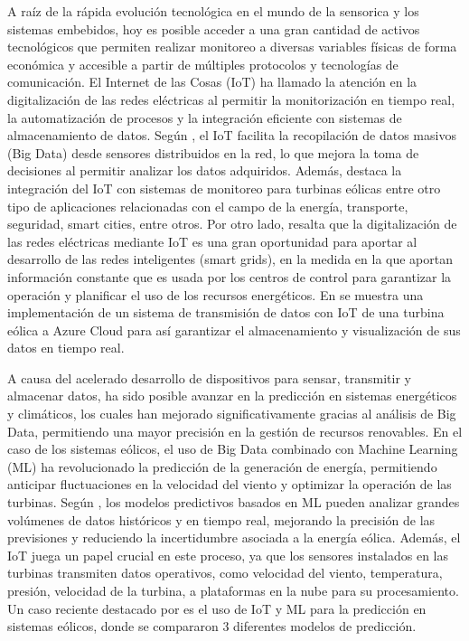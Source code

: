 \documentclass[letterpaper,12pt, oneside]{book}
\begin{document}
A raíz de la rápida evolución tecnológica en el mundo de la sensorica y los sistemas embebidos, hoy es posible acceder a una gran cantidad de activos tecnológicos que permiten realizar monitoreo a diversas variables físicas de forma económica y accesible a partir de múltiples protocolos y tecnologías de comunicación. El Internet de las Cosas (IoT) ha llamado la atención en la digitalización de las redes eléctricas al permitir la monitorización en tiempo real, la automatización de procesos y la integración eficiente con sistemas de almacenamiento de datos. Según \cite{ref19}, el IoT facilita la recopilación de datos masivos (Big Data) desde sensores distribuidos en la red, lo que mejora la toma de decisiones al permitir analizar los datos adquiridos. Además, \cite{ref20} destaca la integración del IoT con sistemas de monitoreo para turbinas eólicas entre otro tipo de aplicaciones relacionadas con el campo de la energía, transporte, seguridad, smart cities, entre otros. Por otro lado, \cite{ref21} resalta que la digitalización de las redes eléctricas mediante IoT es una gran oportunidad para aportar al desarrollo de las redes inteligentes (smart grids), en la medida en la que aportan información constante que es usada por los centros de control para garantizar la operación y planificar el uso de los recursos energéticos. En \cite{ref22} se muestra una implementación de un sistema de transmisión de datos con IoT de una turbina eólica a Azure Cloud para así garantizar el almacenamiento y visualización de sus datos en tiempo real. 


A causa del acelerado desarrollo de dispositivos para sensar, transmitir y almacenar datos, ha sido posible avanzar en la predicción en sistemas energéticos y climáticos, los cuales han mejorado significativamente gracias al análisis de Big Data, permitiendo una mayor precisión en la gestión de recursos renovables. En el caso de los sistemas eólicos, el uso de Big Data combinado con Machine Learning (ML) ha revolucionado la predicción de la generación de energía, permitiendo anticipar fluctuaciones en la velocidad del viento y optimizar la operación de las turbinas. Según \cite{ref23}, los modelos predictivos basados en ML pueden analizar grandes volúmenes de datos históricos y en tiempo real, mejorando la precisión de las previsiones y reduciendo la incertidumbre asociada a la energía eólica. Además, el IoT juega un papel crucial en este proceso, ya que los sensores instalados en las turbinas transmiten datos operativos, como velocidad del viento, temperatura, presión, velocidad de la turbina, a plataformas en la nube para su procesamiento. Un caso reciente destacado por \cite{ref24} es el uso de IoT y ML para la predicción en sistemas eólicos, donde se compararon 3 diferentes modelos de predicción. 
\end{document}
